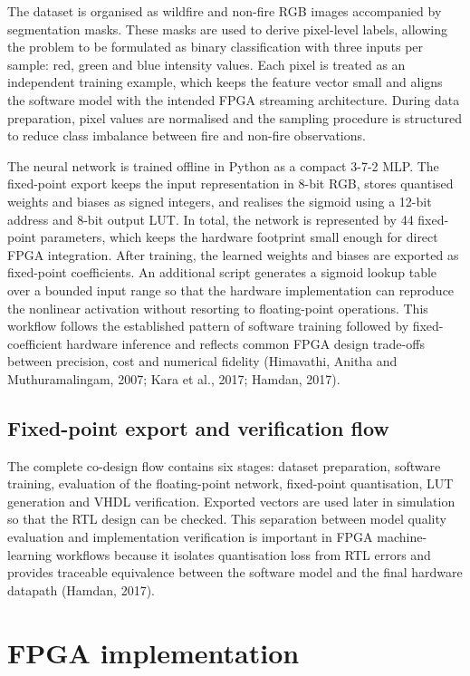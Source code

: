\documentclass[11pt,a4paper]{article}
\begin{document}
The dataset is organised as wildfire and non-fire RGB images accompanied by segmentation masks. These masks are used to derive pixel-level labels, allowing the problem to be formulated as binary classification with three inputs per sample: red, green and blue intensity values. Each pixel is treated as an independent training example, which keeps the feature vector small and aligns the software model with the intended FPGA streaming architecture. During data preparation, pixel values are normalised and the sampling procedure is structured to reduce class imbalance between fire and non-fire observations.

The neural network is trained offline in Python as a compact 3-7-2 MLP. The fixed-point export keeps the input representation in 8-bit RGB, stores quantised weights and biases as signed integers, and realises the sigmoid using a 12-bit address and 8-bit output LUT. In total, the network is represented by 44 fixed-point parameters, which keeps the hardware footprint small enough for direct FPGA integration. After training, the learned weights and biases are exported as fixed-point coefficients. An additional script generates a sigmoid lookup table over a bounded input range so that the hardware implementation can reproduce the nonlinear activation without resorting to floating-point operations. This workflow follows the established pattern of software training followed by fixed-coefficient hardware inference and reflects common FPGA design trade-offs between precision, cost and numerical fidelity (Himavathi, Anitha and Muthuramalingam, 2007; Kara et al., 2017; Hamdan, 2017).

\subsection{Fixed-point export and verification flow}

The complete co-design flow contains six stages: dataset preparation, software training, evaluation of the floating-point network, fixed-point quantisation, LUT generation and VHDL verification. Exported vectors are used later in simulation so that the RTL design can be checked. This separation between model quality evaluation and implementation verification is important in FPGA machine-learning workflows because it isolates quantisation loss from RTL errors and provides traceable equivalence between the software model and the final hardware datapath (Hamdan, 2017).

\section{FPGA implementation}
\end{document}
